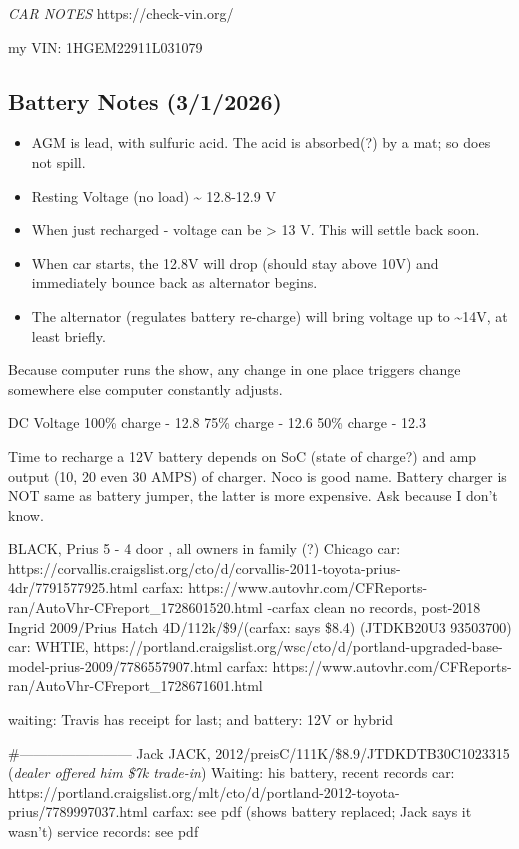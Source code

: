 \documentclass[
]{report}
\providecommand{\tightlist}{%
  \setlength{\itemsep}{0pt}\setlength{\parskip}{0pt}}\usepackage{longtable,booktabs,array}
\begin{document}
\emph{CAR NOTES} https://check-vin.org/

my VIN: 1HGEM22911L031079

\subsection{Battery Notes (3/1/2026)}\label{battery-notes-312026}

\begin{itemize}
\tightlist
\item
  AGM is lead, with sulfuric acid. The acid is absorbed(?) by a mat; so
  does not spill.
\item
  Resting Voltage (no load) \textasciitilde{} 12.8-12.9 V
\item
  When just recharged - voltage can be \textgreater{} 13 V. This will
  settle back soon.
\item
  When car starts, the 12.8V will drop (should stay above 10V) and
  immediately bounce back as alternator begins.
\item
  The alternator (regulates battery re-charge) will bring voltage up to
  \textasciitilde14V, at least briefly.
\end{itemize}

Because computer runs the show, any change in one place triggers change
somewhere else computer constantly adjusts.

DC Voltage 100\% charge - 12.8 75\% charge - 12.6 50\% charge - 12.3

Time to recharge a 12V battery depends on SoC (state of charge?) and amp
output (10, 20 even 30 AMPS) of charger. Noco is good name. Battery
charger is NOT same as battery jumper, the latter is more expensive. Ask
because I don't know.

BLACK, Prius 5 - 4 door , all owners in family (?) Chicago car:
https://corvallis.craigslist.org/cto/d/corvallis-2011-toyota-prius-4dr/7791577925.html
carfax:
https://www.autovhr.com/CFReports-ran/AutoVhr-CFreport\_1728601520.html
-carfax clean no records, post-2018 Ingrid 2009/Prius Hatch
4D/112k/\$9/(carfax: says \$8.4) (JTDKB20U3 93503700) car: WHTIE,
https://portland.craigslist.org/wsc/cto/d/portland-upgraded-base-model-prius-2009/7786557907.html
carfax:
https://www.autovhr.com/CFReports-ran/AutoVhr-CFreport\_1728671601.html

waiting: Travis has receipt for last; and battery: 12V or hybrid

\#------------------------ Jack JACK,
2012/preisC/111K/\$8.9/JTDKDTB30C1023315 (\emph{dealer offered him \$7k
trade-in}) Waiting: his battery, recent records car:
https://portland.craigslist.org/mlt/cto/d/portland-2012-toyota-prius/7789997037.html
carfax: see pdf (shows battery replaced; Jack says it wasn't) service
records: see pdf
\end{document}
